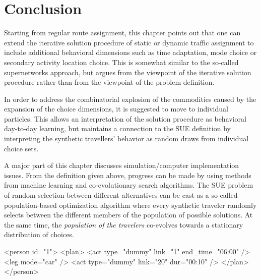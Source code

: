 \section{Conclusion}
\label{sec:agentbased-dta-conclusion}

Starting from
regular route assignment, this chapter points out that one can extend the
iterative solution procedure of static or dynamic traffic assignment
to include additional behavioral dimensions such as time adaptation,
mode choice or secondary activity location choice.  This is somewhat
similar to the so-called supernetworks approach, but argues from the
viewpoint of the iterative solution procedure rather than from the
viewpoint of the problem definition.

In order to address the combinatorial explosion of the commodities
caused by the expansion of the choice dimensions, it is suggested to
move to individual particles.  This allows an interpretation of the
solution procedure as behavioral day-to-day learning, but maintains a
connection to the SUE definition by interpreting the synthetic
travellers' behavior as random draws from individual choice sets.  

A major part of this chapter discusses simulation/computer implementation issues.
From the definition given above, progress can be made by using methods
from machine learning and co-evolutionary search algorithms.  
%
The SUE problem of random selection between different alternatives can
be cast as a so-called population-based optimization algorithm where
every synthetic traveler randomly selects between the different
members of the population of possible solutions.
%
At the same time, the \emph{population of the travelers} co-evolves
towards a stationary distribution of choices.

\newsavebox{\tripAsPlan}
\begin{lrbox}{\tripAsPlan}
\begin{xml}
<person id="1">
   <plan>
      <act type="dummy" link="1" end_time="06:00" />
      <leg mode="car" />
      <act type="dummy" link="20" dur="00:10" />
   </plan>
</person>
\end{xml}
\end{lrbox}

